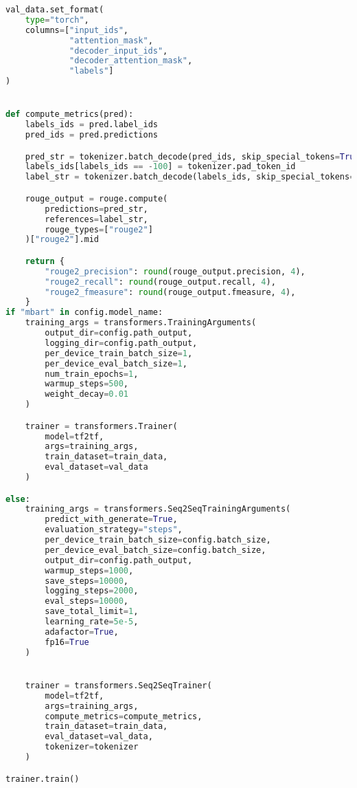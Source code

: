 \begin{lstlisting}[language=Python, caption=Trainingscode]
val_data.set_format(
    type="torch",
    columns=["input_ids",
             "attention_mask",
             "decoder_input_ids",
             "decoder_attention_mask",
             "labels"]
)


def compute_metrics(pred):
    labels_ids = pred.label_ids
    pred_ids = pred.predictions

    pred_str = tokenizer.batch_decode(pred_ids, skip_special_tokens=True)
    labels_ids[labels_ids == -100] = tokenizer.pad_token_id
    label_str = tokenizer.batch_decode(labels_ids, skip_special_tokens=True)

    rouge_output = rouge.compute(
        predictions=pred_str,
        references=label_str,
        rouge_types=["rouge2"]
    )["rouge2"].mid

    return {
        "rouge2_precision": round(rouge_output.precision, 4),
        "rouge2_recall": round(rouge_output.recall, 4),
        "rouge2_fmeasure": round(rouge_output.fmeasure, 4),
    }
if "mbart" in config.model_name:
    training_args = transformers.TrainingArguments(
        output_dir=config.path_output,
        logging_dir=config.path_output,
        per_device_train_batch_size=1,
        per_device_eval_batch_size=1,
        num_train_epochs=1,
        warmup_steps=500,
        weight_decay=0.01
    )

    trainer = transformers.Trainer(
        model=tf2tf,
        args=training_args,
        train_dataset=train_data,
        eval_dataset=val_data
    )

else:
    training_args = transformers.Seq2SeqTrainingArguments(
        predict_with_generate=True,
        evaluation_strategy="steps",
        per_device_train_batch_size=config.batch_size,
        per_device_eval_batch_size=config.batch_size,
        output_dir=config.path_output,
        warmup_steps=1000,
        save_steps=10000,
        logging_steps=2000,
        eval_steps=10000,
        save_total_limit=1,
        learning_rate=5e-5,
        adafactor=True,
        fp16=True
    )


    trainer = transformers.Seq2SeqTrainer(
        model=tf2tf,
        args=training_args,
        compute_metrics=compute_metrics,
        train_dataset=train_data,
        eval_dataset=val_data,
        tokenizer=tokenizer
    )

trainer.train()
\end{lstlisting}
\newpage


